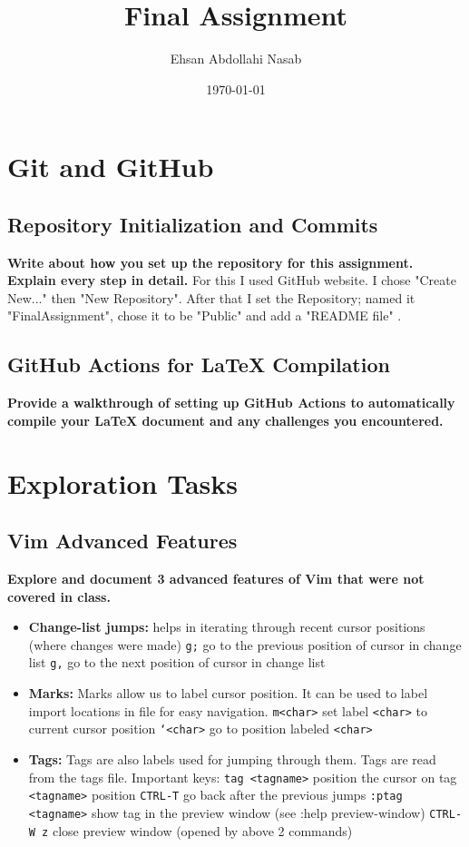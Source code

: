 \documentclass{article}
\title{Final Assignment}
\author{Ehsan Abdollahi Nasab}
\date{\today}
\begin{document}
    \maketitle

    \section{Git and GitHub}
    \subsection{Repository Initialization and Commits}
    \textbf{Write about how you set up the repository for this assignment. Explain every step in detail.}
    {\color{mygreen}
    For this I used GitHub website. I chose "Create New..." then "New Repository". After that I set the Repository; named it "FinalAssignment", chose it to be "Public" and add a "README file"
    \color{black}.}
    \subsection{GitHub Actions for LaTeX Compilation}
    \textbf{Provide a walkthrough of setting up GitHub Actions to automatically compile your LaTeX document and any challenges you encountered.}
    {\color{mygreen}
    \color{black}}

    \section{Exploration Tasks}
    \subsection{Vim Advanced Features}
    \textbf{Explore and document 3 advanced features of Vim that were not covered in class.}
    {\color{mygreen}
    \begin{itemize}
        \item \textbf{Change-list jumps:} helps in iterating through recent cursor positions (where changes were made)
        \texttt{g;} go to the previous position of cursor in change list
        \texttt{g,} go to the next position of cursor in change list
        \item \textbf{Marks:} Marks allow us to label cursor position. It can be used to label import locations in file for easy navigation.
        \texttt{m<char>} set label \texttt{<char>} to current cursor position
        \texttt{`<char>} go to position labeled \texttt{<char>}
        \item \textbf{Tags:} Tags are also labels used for jumping through them. Tags are read from the tags file.
        Important keys:
        \texttt{tag <tagname>} position the cursor on tag \texttt{<tagname>} position
        \texttt{CTRL-T} go back after the previous jumps
        \texttt{:ptag <tagname>} show tag in the preview window (see :help preview-window)
        \texttt{CTRL-W z} close preview window (opened by above 2 commands)
    \end{itemize}}
    \color{black}
    
\end{document}
